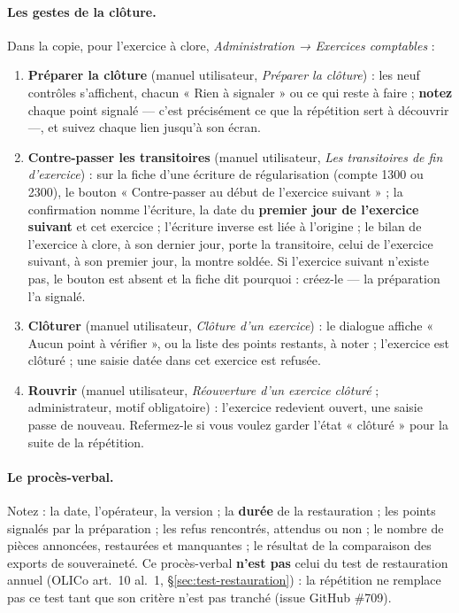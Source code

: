 \documentclass[a4paper,11pt,oneside]{article}
\begin{document}
\paragraph{Les gestes de la clôture.} Dans la copie, pour l'exercice à clore, \emph{Administration → Exercices comptables} :
\begin{enumerate}
    \item \textbf{Préparer la clôture} (manuel utilisateur, \emph{Préparer la clôture}) : les neuf contrôles s'affichent, chacun « Rien à signaler » ou ce qui reste à faire ; \textbf{notez} chaque point signalé --- c'est précisément ce que la répétition sert à découvrir ---, et suivez chaque lien jusqu'à son écran.
    \item \textbf{Contre-passer les transitoires} (manuel utilisateur, \emph{Les transitoires de fin d'exercice}) : sur la fiche d'une écriture de régularisation (compte 1300 ou 2300), le bouton « Contre-passer au début de l'exercice suivant » ; la confirmation nomme l'écriture, la date du \textbf{premier jour de l'exercice suivant} et cet exercice ; l'écriture inverse est liée à l'origine ; le bilan de l'exercice à clore, à son dernier jour, porte la transitoire, celui de l'exercice suivant, à son premier jour, la montre soldée. Si l'exercice suivant n'existe pas, le bouton est absent et la fiche dit pourquoi : créez-le --- la préparation l'a signalé.
    \item \textbf{Clôturer} (manuel utilisateur, \emph{Clôture d'un exercice}) : le dialogue affiche « Aucun point à vérifier », ou la liste des points restants, à noter ; l'exercice est clôturé ; une saisie datée dans cet exercice est refusée.
    \item \textbf{Rouvrir} (manuel utilisateur, \emph{Réouverture d'un exercice clôturé} ; administrateur, motif obligatoire) : l'exercice redevient ouvert, une saisie passe de nouveau. Refermez-le si vous voulez garder l'état « clôturé » pour la suite de la répétition.
\end{enumerate}

\paragraph{Le procès-verbal.} Notez : la date, l'opérateur, la version ; la \textbf{durée} de la restauration ; les points signalés par la préparation ; les refus rencontrés, attendus ou non ; le nombre de pièces annoncées, restaurées et manquantes ; le résultat de la comparaison des exports de souveraineté. Ce procès-verbal \textbf{n'est pas} celui du test de restauration annuel (OLICo art.~10 al.~1, \S\ref{sec:test-restauration}) : la répétition ne remplace pas ce test tant que son critère n'est pas tranché (issue GitHub \#709).
\end{document}
